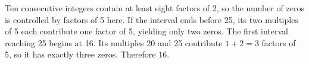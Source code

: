 Ten consecutive integers contain at least eight factors of 2, so the number of zeros is controlled by factors of 5 here. If the interval ends before 25, its two multiples of 5 each contribute one factor of 5, yielding only two zeros. The first interval reaching 25 begins at 16. Its multiples 20 and 25 contribute $1+2=3$ factors of 5, so it has exactly three zeros. Therefore $\boxed{16}$.
